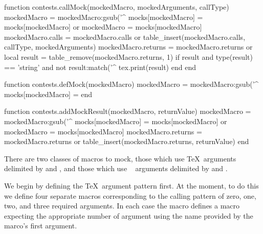 \startLuaCode
function contests.callMock(mockedMacro, mockedArguments, callType)
  mockedMacro = mockedMacro:gsub('^%
  mocks[mockedMacro] = mocks[mockedMacro] or { }
  mockedMacro = mocks[mockedMacro]
  mockedMacro.calls = mockedMacro.calls or { }
  table_insert(mockedMacro.calls, { callType, mockedArguments})
  mockedMacro.returns = mockedMacro.returns or { }
  local result = table_remove(mockedMacro.returns, 1)
  if result and type(result) == 'string' and not result:match('^%
    tex.print(result)
  end
end

function contests.defMock(mockedMacro)
  mockedMacro = mockedMacro:gsub('^%
  mocks[mockedMacro] = { }
end

function contests.addMockResult(mockedMacro, returnValue)
  mockedMacro = mockedMacro:gsub('^%
  mocks[mockedMacro] = mocks[mockedMacro] or { }
  mockedMacro = mocks[mockedMacro]
  mockedMacro.returns = mockedMacro.returns or { }
  table_insert(mockedMacro.returns, returnValue)
end
\stopLuaCode


There are two classes of macros to mock, those which use  
\TeX\ arguments delimited by \quote{\{} and \quote{\}}, and those which 
use \ConTeXt\  arguments delimited by \quote{\[} and 
\quote{\]}. 

We begin by defining the \TeX\ argument pattern first. At the moment, to 
do this we define four separate macros corresponding to the calling 
pattern of zero, one, two, and three required arguments. In each case the 
 macro defines a macro expecting the appropriate 
number of argument using the name provided by the  
marco's first argument. 

\startMkIVCode
\def\callTexMockZero#1{%
  \directlua{%
    thirddata.contests.callMock('#1', { }, 'tex')
  }
}
\def\defTexMockZeroArgs#1{%
  \directlua{thirddata.contests.defMock('#1')}%
  \setevalue{#1}{\noexpand\callTexMockZero{#1}}%
}

\def\callTexMockOne#1#2{%
  \directlua{%
    thirddata.contests.callMock('#1', { '#2' }, 'tex')
  }
}
\def\defTexMockOneArg#1{%
  \directlua{thirddata.contests.defMock('#1')}%
  \setevalue{#1}{\noexpand\callTexMockOne{#1}}%
}

\def\callTexMockTwo#1#2#3{%
  \directlua{%
    thirddata.contests.callMock('#1', { '#2', '#3' }, 'tex')
  }
}
\def\defTexMockTwoArgs#1{%
  \directlua{thirddata.contests.defMock('#1')}%
  \setevalue{#1}{\noexpand\callTexMockTwo{#1}}%
}

